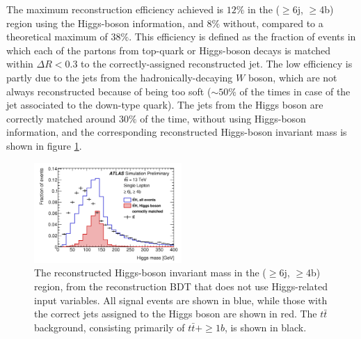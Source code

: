 The maximum reconstruction efficiency achieved is $12\%$ in the ($\ge$6j, $\ge$4b) region using the Higgs-boson information, and $8\%$ without, compared to a theoretical maximum of $38\%$. This efficiency is defined as the fraction of events in which each of the partons from top-quark or Higgs-boson decays is matched within $\Delta R < 0.3$ to the correctly-assigned reconstructed jet. The low efficiency is partly due to the jets from the hadronically-decaying $W$ boson, which are not always reconstructed because of being too soft ($\sim50\%$ of the times in case of the jet associated to the down-type quark). The jets from the Higgs boson are correctly matched around $30\%$ of the time, without using Higgs-boson information, and the corresponding reconstructed Higgs-boson invariant mass is shown in figure \ref{sec:tth:fig:recobdt}.

\begin{figure}[h!]
\centering
\includegraphics[width=0.5\textwidth]{figures/ttH/fig_05b.png}
\captionsetup{width=0.85\textwidth} \caption{\small The reconstructed Higgs-boson invariant mass in the ($\ge$6j, $\ge$4b) region, from the reconstruction BDT that does not use Higgs-related input variables. All signal events are shown in blue, while those with the correct jets assigned to the Higgs boson are shown in red. The $t\bar{t}$ background, consisting primarily of $t\bar{t}+\ge1b$, is shown in black.}
\label{sec:tth:fig:recobdt}
\end{figure}


